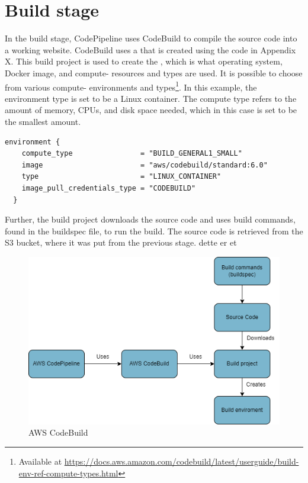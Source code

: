 \section{Build stage}
In the build stage, CodePipeline uses CodeBuild to compile the source code into a working website. CodeBuild uses a  that is created using the code in Appendix X. This build project is used to create the , which is what operating system, Docker image, and compute- resources and types are used.  It is possible to choose from various compute- environments and types\footnote{Available at \url{https://docs.aws.amazon.com/codebuild/latest/userguide/build-env-ref-compute-types.html}}. In this example, the environment type is set to be a Linux container. The compute type refers to the amount of memory, CPUs, and disk space needed, which in this case is set to be the smallest amount. 

\begin{tcolorbox}
\begin{verbatim}
environment {
    compute_type                = "BUILD_GENERAL1_SMALL"
    image                       = "aws/codebuild/standard:6.0"
    type                        = "LINUX_CONTAINER"
    image_pull_credentials_type = "CODEBUILD"
  }
\end{verbatim}
\end{tcolorbox}

Further, the build project downloads the source code and uses build commands, found in the \gls{buildspec} file, to run the build. The source code is retrieved from the S3 bucket, where it was put from the previous stage. \cite{CodeBuildProcess}
dette er et 
\vspace{2mm}
\begin{figure}[H]
    \centering
    \includegraphics[scale=0.4]{Images/CodeBuild.drawio.png}
    \caption{AWS CodeBuild} 
    \label{fig: AWS CodeBuild}
\end{figure}

